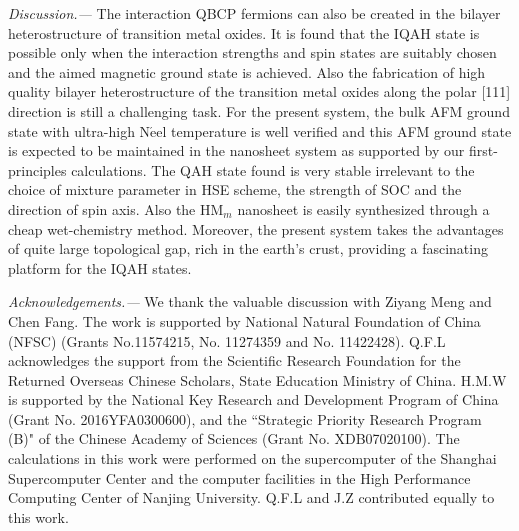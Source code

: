 \documentclass[twocolumn,english,prb,showpacs]{revtex4-1}
\begin{document}


\vspace{3mm}
\noindent\textit{Discussion.---}
The interaction QBCP fermions can also be created in the bilayer heterostructure of transition metal oxides\cite{RueggPRB,XiDai2014PRB}. It is found that the IQAH state is possible only when the interaction strengths and spin states are suitably chosen and the aimed magnetic ground state is achieved. Also the fabrication of high quality bilayer heterostructure of the transition metal oxides along the polar [111] direction is still a challenging task. For the present system, the bulk AFM ground state with ultra-high N$\acute{\text{e}}$el temperature is well verified and this AFM ground state is expected to be maintained in the nanosheet system as supported by our first-principles calculations. The QAH state found is very stable irrelevant to the choice of  mixture parameter in HSE scheme, the strength of SOC and the direction of spin axis. Also the HM$_{m}$ nanosheet is easily synthesized through a cheap wet-chemistry method\cite{WXHMNS}. Moreover, the present system takes the advantages of quite large topological gap, rich in the earth's crust, providing a fascinating platform for the IQAH states.


\vspace{3mm}
\noindent\textit{Acknowledgements.---}
We thank the valuable discussion with Ziyang Meng and Chen Fang. The work is supported by National Natural Foundation of China (NFSC) (Grants No.11574215, No. 11274359 and No. 11422428). Q.F.L acknowledges the support from the Scientific Research Foundation for the Returned Overseas Chinese Scholars, State Education Ministry of China. H.M.W is supported by the National Key Research and Development Program of China (Grant No. 2016YFA0300600), and the ``Strategic Priority Research Program (B)" of the Chinese Academy of Sciences (Grant No. XDB07020100). The calculations in this work were performed on the supercomputer of the Shanghai Supercomputer Center and the computer facilities in the High Performance Computing Center of Nanjing University. Q.F.L and J.Z contributed equally to this work.



\end{document}
